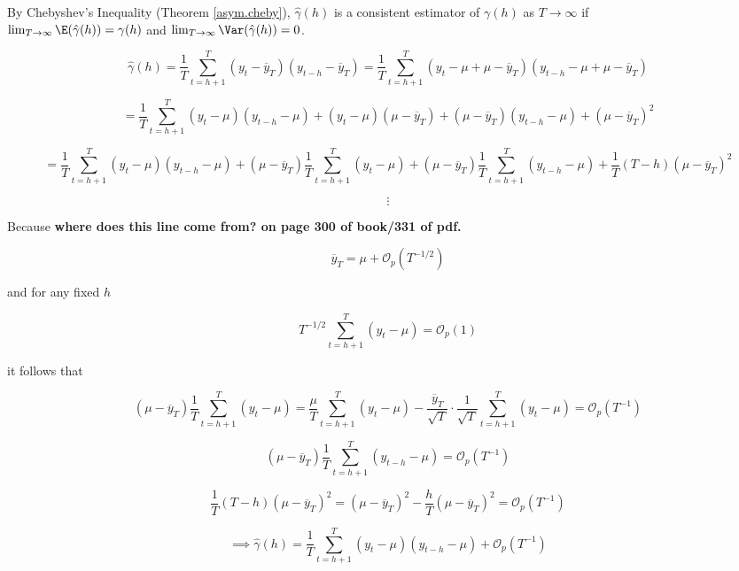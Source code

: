 By Chebyshev's Inequality (Theorem \ref{asym.cheby}), \(\hat{\gamma}(h) \) is a consistent estimator of \(\gamma(h)\) as \(T \to \infty\) if \\ \(\lim_{T \to \infty} \E(\hat{\gamma}(h)) = \gamma(h)\) and \(\lim_{T \to \infty} \Var(\hat{\gamma}(h)) = 0\).

\[
\hat{\gamma}(h) = \frac{1}{T} \sum_{t=h+1}^T(y_t - \overline{y}_T)(y_{t-h} - \overline{y}_T) = \frac{1}{T} \sum_{t=h+1}^T(y_t - \mu + \mu - \overline{y}_T)(y_{t-h} - \mu + \mu -  \overline{y}_T)
\]

\[
= \frac{1}{T} \sum_{t=h+1}^T(y_t - \mu)(y_{t-h} - \mu) + (y_t - \mu)(\mu -  \overline{y}_T) + (\mu - \overline{y}_T)(y_{t-h} - \mu) + (\mu - \overline{y}_T)^2
\]

\[
= \frac{1}{T} \sum_{t=h+1}^T(y_t - \mu)(y_{t-h} - \mu) + (\mu -  \overline{y}_T)  \frac{1}{T} \sum_{t=h+1}^T (y_t - \mu)+ (\mu - \overline{y}_T) \frac{1}{T} \sum_{t=h+1}^T(y_{t-h} - \mu) + \frac{1}{T}(T - h)(\mu - \overline{y}_T)^2
\]



\[
\vdots
\]

Because \textbf{where does this line come from? on page 300 of book/331 of pdf.}

\[
\overline{y}_T = \mu + \mathcal{O}_p(T^{-1/2})
\]

and for any fixed \(h\)

\[
T^{-1/2} \sum_{t=h+1}^T (y_t - \mu) = \mathcal{O}_p(1)
\]

it follows that 

\[
 (\mu -  \overline{y}_T)  \frac{1}{T} \sum_{t=h+1}^T (y_t - \mu) =  \frac{\mu}{T} \sum_{t=h+1}^T (y_t - \mu) -  \frac{\overline{y}_T}{\sqrt{T}} \cdot \frac{1}{\sqrt{T}} \sum_{t=h+1}^T (y_t - \mu) =\mathcal{O}_p(T^{-1})
\]

\[
 (\mu - \overline{y}_T) \frac{1}{T} \sum_{t=h+1}^T(y_{t-h} - \mu)  =\mathcal{O}_p(T^{-1})
\]

\[
\frac{1}{T}(T - h)(\mu - \overline{y}_T)^2 = (\mu - \overline{y}_T)^2 - \frac{h}{T}(\mu - \overline{y}_T)^2 = \mathcal{O}_p(T^{-1})
\]

\[
\implies \hat{\gamma}(h)  = \frac{1}{T} \sum_{t=h+1}^T(y_t - \mu)(y_{t-h} - \mu) + \mathcal{O}_p(T^{-1}) 
\]

%
%
%
%


